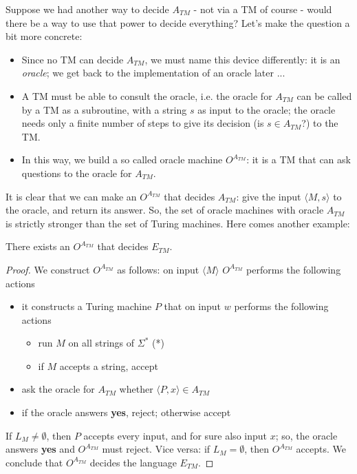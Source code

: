 Suppose we had another way to decide $A_{TM}$ - not via a TM of course -
would there be a way to use that power to decide everything? Let's
make the question a bit more concrete:
\begin{itemize}
\item Since no TM can decide $A_{TM}$, we must name this device
  differently: it is an {\em oracle}; we get back to the
  implementation of an oracle later ...

\item A TM must be able to consult the oracle, i.e. the oracle for
  $A_{TM}$ can be called by a TM as a subroutine, with a string $s$ as
  input to the oracle; the oracle needs only a finite number of steps
  to give its decision (is $s \in A_{TM}$?) to the TM.

\item In this way, we build a so called oracle machine $O^{A_{TM}}$:
  it is a TM that can ask questions to the oracle for $A_{TM}$.
\end{itemize}

It is clear that we can make an $O^{A_{TM}}$ that decides $A_{TM}$:
give the input $\langle M,s \rangle$ to the oracle, and return its
answer. So, the set of oracle machines with oracle $A_{TM}$ is
strictly stronger than the set of Turing machines. Here comes another
example:

\begin{theorem}
There exists an $O^{A_{TM}}$ that decides $E_{TM}$.
\end{theorem}
\begin{proof}
We construct $O^{A_{TM}}$ as follows: on input $\langle M \rangle$
$O^{A_{TM}}$ performs the following actions
\begin{itemize}
\item
it constructs a Turing machine $P$ that on input $w$ performs the
following actions
\begin{itemize}
\item run $M$ on all strings of $\Sigma^*$ (*)\label{allestrings}
\item if $M$ accepts a string, accept
\end{itemize}

\item ask the oracle for $A_{TM}$ whether $\langle P,x \rangle \in
  A_{TM}$

\item if the oracle answers {\bf yes}, reject; otherwise accept
\end{itemize}
If $L_M \neq \emptyset$, then $P$ accepts every input, and for sure
also input $x$; so, the oracle answers {\bf yes} and $O^{A_{TM}}$ must
reject. Vice versa: if $L_M = \emptyset$, then $O^{A_{TM}}$
accepts. We conclude that $O^{A_{TM}}$ decides the language $E_{TM}$.
\end{proof}


